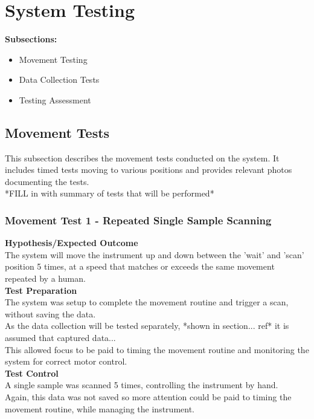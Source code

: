 \documentclass{UoNMCHA}
\numberwithin{equation}{section}
\begin{document}
\section{System Testing}\label{sec:System Testing}
\textbf{Subsections:}\\
\begin{itemize}
	\item Movement Testing
	\item Data Collection Tests
	\item Testing Assessment
\end{itemize}
\subsection{Movement Tests}\label{sub:Movement Tests}
This subsection describes the movement tests conducted on the system. It includes timed tests moving to various positions and provides relevant photos documenting the tests.\\
*FILL in with summary of tests that will be performed*\\
\subsubsection{Movement Test 1 - Repeated Single Sample Scanning}\label{subsub:Movement Test 1}
\textbf{Hypothesis/Expected Outcome}\\

The system will move the instrument up and down between the 'wait' and 'scan' position 5 times, at a speed that matches or exceeds the same movement repeated by a human.\\

\textbf{Test Preparation}\\

The system was setup to complete the movement routine and trigger a scan, without saving the data.\\
As the data collection will be tested separately, *shown in section... ref* it is assumed that captured data...\\ 
This allowed focus to be paid to timing the movement routine and monitoring the system for correct motor control. \\

\textbf{Test Control}\\
A single sample was scanned 5 times, controlling the instrument by hand.\\
Again, this data was not saved so more attention could be paid to timing the movement routine, while managing the instrument. \\
\end{document}
